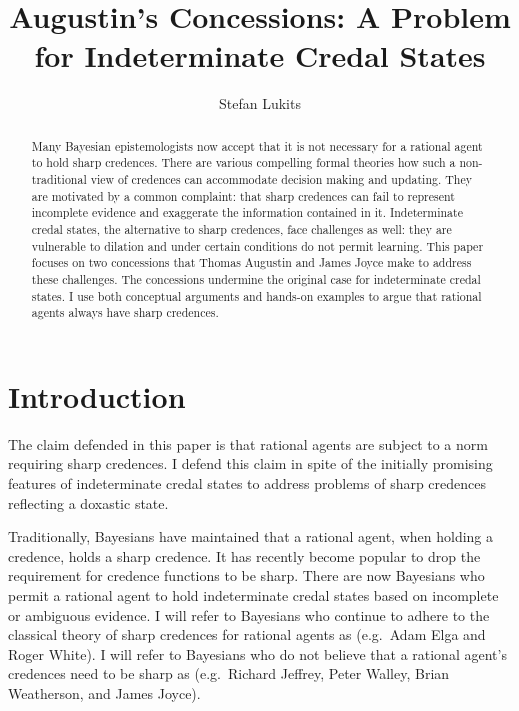 \documentclass[11pt]{article}
\begin{document}
\setpagewiselinenumbers
\modulolinenumbers[5]
\linenumbers

\title{Augustin's Concessions: A Problem for Indeterminate Credal States}
\author{Stefan Lukits}
\date{}
\maketitle

\begin{abstract} 
  {\noindent}Many Bayesian epistemologists now accept that it is not
  necessary for a rational agent to hold sharp credences. There are
  various compelling formal theories how such a non-traditional view
  of credences can accommodate decision making and updating. They are
  motivated by a common complaint: that sharp credences can fail to
  represent incomplete evidence and exaggerate the information
  contained in it. Indeterminate credal states, the alternative to
  sharp credences, face challenges as well: they are vulnerable to
  dilation and under certain conditions do not permit learning. This
  paper focuses on two concessions that Thomas Augustin and James
  Joyce make to address these challenges. The concessions undermine
  the original case for indeterminate credal states. I use both
  conceptual arguments and hands-on examples to argue that rational
  agents always have sharp credences.
\end{abstract}

\section{Introduction}
\label{Introduction}

The claim defended in this paper is that rational agents are subject
to a norm requiring sharp credences. I defend this claim in spite of
the initially promising features of indeterminate credal states to
address problems of sharp credences reflecting a doxastic state.

Traditionally, Bayesians have maintained that a rational agent, when
holding a credence, holds a sharp credence. It has recently become
popular to drop the requirement for credence functions to be sharp.
There are now Bayesians who permit a rational agent to hold
indeterminate credal states based on incomplete or ambiguous evidence.
I will refer to Bayesians who continue to adhere to the classical
theory of sharp credences for rational agents as 
(e.g.\ Adam Elga and Roger White). I will refer to Bayesians who do
not believe that a rational agent's credences need to be sharp as
 (e.g.\ Richard Jeffrey, Peter Walley, Brian
Weatherson, and James Joyce).
\end{document}
